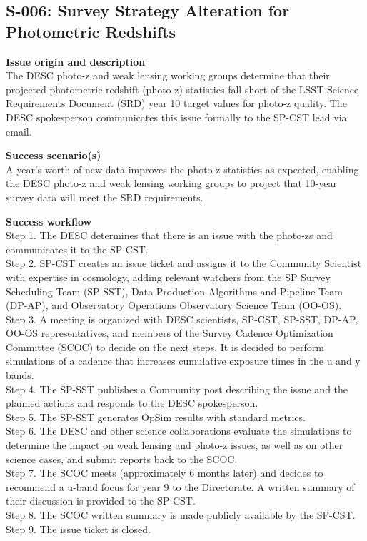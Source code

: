 \subsection{S-006: Survey Strategy Alteration for Photometric Redshifts}

\textbf{Issue origin and description} \\
The DESC photo-z and weak lensing working groups determine that their projected photometric redshift (photo-z) statistics fall short of the LSST Science Requirements Document (SRD) year 10 target values for photo-z quality.
The DESC spokesperson communicates this issue formally to the SP-CST lead via email.

\textbf{Success scenario(s)} \\
A year's worth of new data improves the photo-z statistics as expected, enabling the DESC photo-z and weak lensing working groups to project that 10-year survey data will meet the SRD requirements.

\textbf{Success workflow} \\
Step 1. The DESC determines that there is an issue with the photo-zs and communicates it to the SP-CST. \\
Step 2. SP-CST creates an issue ticket and assigns it to the Community Scientist with expertise in cosmology, adding relevant watchers from the SP Survey Scheduling Team (SP-SST), Data Production Algorithms and Pipeline Team (DP-AP), and Observatory Operations Observatory Science Team (OO-OS). \\
Step 3. A meeting is organized with DESC scientists, SP-CST, SP-SST, DP-AP, OO-OS representatives, and members of the Survey Cadence Optimization Committee (SCOC) to decide on the next steps.
It is decided to perform simulations of a cadence that increases cumulative exposure times in the u and y bands. \\
Step 4. The SP-SST publishes a Community post describing the issue and the planned actions and responds to the DESC spokesperson. \\
Step 5. The SP-SST generates OpSim results with standard metrics. \\
Step 6. The DESC and other science collaborations evaluate the simulations to determine the impact on weak lensing and photo-z issues, as well as on other science cases, and submit reports back to the SCOC. \\
Step 7. The SCOC meets (approximately 6 months later) and decides to recommend a u-band focus for year 9 to the Directorate.
A written summary of their discussion is provided to the SP-CST. \\
Step 8. The SCOC written summary is made publicly available by the SP-CST. \\
Step 9. The issue ticket is closed. \\


